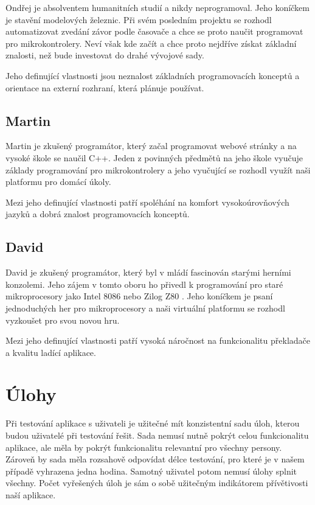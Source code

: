 Ondřej je absolventem humanitních studií a nikdy neprogramoval. Jeho koníčkem je stavění modelových železnic. Při svém posledním projektu se rozhodl automatizovat zvedání závor podle časovače a chce se proto naučit programovat pro mikrokontrolery. Neví však kde začít a chce proto nejdříve získat základní znalosti, než bude investovat do drahé vývojové sady.

Jeho definující vlastnosti jsou neznalost základních programovacích konceptů a orientace na externí rozhraní, která plánuje používat.

\subsection{Martin}
\label{persona:b}

Martin je zkušený programátor, který začal programovat webové stránky a na vysoké škole se naučil C++. Jeden z povinných předmětů na jeho škole vyučuje základy programování pro mikrokontrolery a jeho vyučující se rozhodl využít naši platformu pro domácí úkoly.

Mezi jeho definující vlastnosti patří spoléhání na komfort vysokoúrovňových jazyků a dobrá znalost programovacích konceptů.

\subsection{David}
\label{persona:c}

David je zkušený programátor, který byl v mládí fascinován starými herními konzolemi. Jeho zájem v tomto oboru ho přivedl k programování pro staré mikroprocesory jako Intel 8086 nebo Zilog Z80 . Jeho koníčkem je psaní jednoduchých her pro mikroprocesory a naši virtuální platformu se rozhodl vyzkoušet pro svou novou hru.

Mezi jeho definující vlastnosti patří vysoká náročnost na funkcionalitu překladače a kvalitu ladící aplikace.

\section{Úlohy}

Při testování aplikace s uživateli je užitečné mít konzistentní sadu úloh, kterou budou uživatelé při testování řešit. Sada nemusí nutně pokrýt celou funkcionalitu aplikace, ale měla by pokrýt funkcionalitu relevantní pro všechny persony. Zároveň by sada měla rozsahově odpovídat délce testování, pro které je v našem případě vyhrazena jedna hodina. Samotný uživatel potom nemusí úlohy splnit všechny. Počet vyřešených úloh je sám o sobě užitečným indikátorem přívětivosti naší aplikace.

